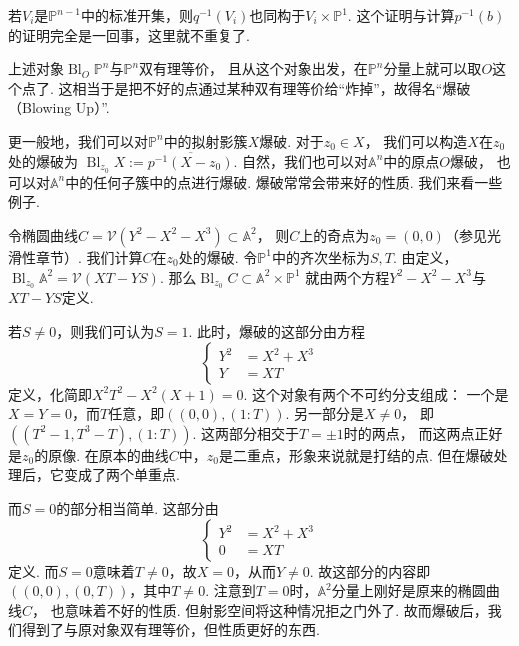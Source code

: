     若$V_{i}$是$\mathbb{P}^{n-1}$中的标准开集，则$q^{-1}(V_{i})$也同构于$V_{i}\times \mathbb{P}^{1}$.
    这个证明与计算$p^{-1}(b)$的证明完全是一回事，这里就不重复了.

    上述对象$\operatorname{Bl}_{O}\mathbb{P}^{n}$与$\mathbb{P}^{n}$双有理等价，
    且从这个对象出发，在$\mathbb{P}^{n}$分量上就可以取$O$这个点了. 
    这相当于是把不好的点通过某种双有理等价给“炸掉”，故得名“爆破（Blowing Up）”.

    更一般地，我们可以对$\mathbb{P}^{n}$中的拟射影簇$X$爆破. 对于$z_{0} \in X$，
    我们可以构造$X$在$z_{0}$处的爆破为
    $\operatorname{Bl}_{z_{0}}X := \overline{p^{-1}(X - z_{0})}$.
    自然，我们也可以对$\mathbb{A}^{n}$中的原点$O$爆破，
    也可以对$\mathbb{A}^{n}$中的任何子簇中的点进行爆破. 爆破常常会带来好的性质.
    我们来看一些例子.
    
    \begin{example}
        令椭圆曲线$C = \mathcal{V}(Y^{2}-X^{2}-X^{3}) \subset \mathbb{A}^{2}$，
        则$C$上的奇点为$z_{0}=(0,0)$（参见光滑性章节）.
        我们计算$C$在$z_{0}$处的爆破. 令$\mathbb{P}^{1}$中的齐次坐标为$S,T$.
        由定义，$\operatorname{Bl}_{z_{0}}\mathbb{A}^{2}=\mathcal{V}(XT-YS)$.
        那么$\operatorname{Bl}_{z_{0}}C \subset \mathbb{A}^{2} \times \mathbb{P}^{1}$
        就由两个方程$Y^{2}-X^{2}-X^{3}$与$XT-YS$定义.

        若$S \neq 0$，则我们可认为$S=1$. 
        此时，爆破的这部分由方程
        \begin{equation*}\left\{\begin{aligned}
                Y^{2} &= X^{2} + X^{3} \\
                Y &=XT
        \end{aligned}\right.\end{equation*}
        定义，化简即$X^{2}T^{2}-X^{2}(X+1)=0$. 这个对象有两个不可约分支组成：
        一个是$X=Y=0$，而$T$任意，即$((0,0),(1:T))$. 另一部分是$X \neq 0$，
        即$((T^{2}-1,T^{3}-T),(1:T))$. 这两部分相交于$T=\pm 1$时的两点，
        而这两点正好是$z_{0}$的原像. 在原本的曲线$C$中，$z_{0}$是二重点，形象来说就是打结的点.
        但在爆破处理后，它变成了两个单重点.

        而$S = 0$的部分相当简单. 这部分由
        \begin{equation*}\left\{\begin{aligned}
                Y^{2} &= X^{2} + X^{3} \\
                0 &=XT
        \end{aligned}\right.\end{equation*}
        定义. 而$S = 0$意味着$T \neq 0$，故$X=0$，从而$Y \neq 0$. 
        故这部分的内容即$((0,0),(0,T))$，其中$T \neq 0$. 
        注意到$T = 0$时，$\mathbb{A}^{2}$分量上刚好是原来的椭圆曲线$C$，
        也意味着不好的性质. 但射影空间将这种情况拒之门外了.
        故而爆破后，我们得到了与原对象双有理等价，但性质更好的东西.
    \end{example}

